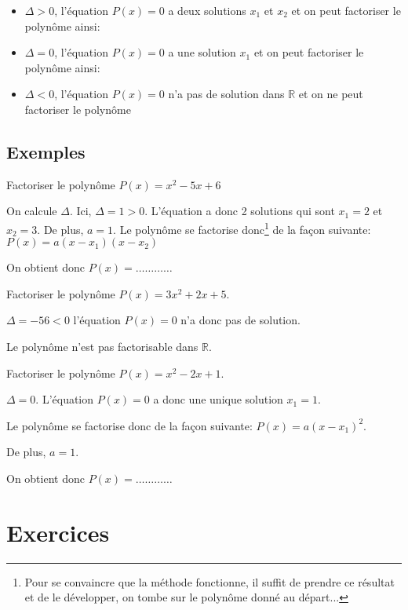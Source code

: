 \documentclass[a4paper,12pt]{scrartcl}
\begin{document}
\begin{itemize}
\item $\Delta > 0$, l'équation $P(x) = 0$ a deux solutions $x_1$ et $x_2$ et on peut factoriser le polynôme ainsi: 

\item $\Delta = 0$, l'équation $P(x) = 0$ a une solution $x_1$ et on peut factoriser le polynôme ainsi: 

\item $\Delta < 0$, l'équation $P(x) = 0$ n'a pas de solution dans $\mathbb{R}$ et on ne peut factoriser le polynôme
\end{itemize}

\subsection{Exemples}

\exemple{}
Factoriser le polynôme $P(x) = x^2 - 5x + 6$

On calcule $\Delta$. Ici, $\Delta = 1 > 0$. L'équation a donc 2 solutions qui sont $x_1 = 2$ et $x_2 = 3$. De plus, $a = 1$. Le polynôme se factorise donc\footnote{Pour se convaincre que la méthode fonctionne, il suffit de prendre ce résultat et de le développer, on tombe sur le polynôme donné au départ...} de la façon suivante: $P(x) = a(x - x_1) (x - x_2)$

On obtient donc $P(x) = \ldots\ldots\ldots\ldots$

\exemple{}
Factoriser le polynôme $P(x) = 3x^2 + 2x + 5$.

$\Delta = -56 < 0$ l'équation $P(x) = 0$ n'a donc pas de solution. 

Le polynôme n'est pas factorisable dans $\mathbb{R}$.

\exemple{}
Factoriser le polynôme $P(x) = x^2 - 2x + 1$.

$\Delta = 0$. L'équation $P(x) = 0$ a donc une unique solution $x_1 = 1$. 

Le polynôme se factorise donc de la façon suivante: $P(x) = a(x - x_1)^2$. 

De plus, $a = 1$.

On obtient donc $P(x) = \ldots\ldots\ldots\ldots$

\section*{Exercices}

\end{document}
